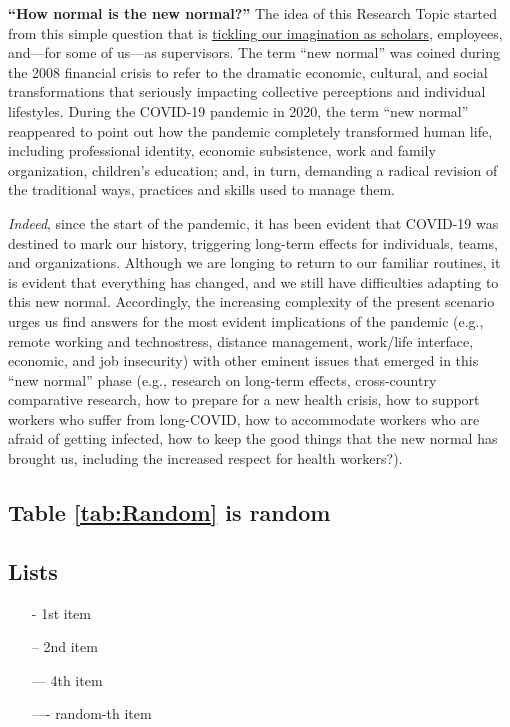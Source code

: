 \begin{flushleft}
    \textbf{“How normal is the new normal?”} The idea of this Research Topic started from this simple question that is \underline{tickling our imagination as scholars}, employees, and—for some of us—as supervisors. The term “new normal” was coined during the 2008 financial crisis to refer to the dramatic economic, cultural, and social transformations that seriously impacting collective perceptions and individual lifestyles. During the COVID-19 pandemic in 2020, the term “new normal” reappeared to point out how the pandemic completely transformed human life, including professional identity, economic subsistence, work and family organization, children's education; and, in turn, demanding a radical revision of the traditional ways, practices and skills used to manage them.\par
\textit{Indeed}, since the start of the pandemic, it has been evident that COVID-19 was destined to mark our history, triggering long-term effects for individuals, teams, and organizations. Although we are longing to return to our familiar routines, it is evident that everything has changed, and we still have difficulties adapting to this new normal. Accordingly, the increasing complexity of the present scenario urges us find answers for the most evident implications of the pandemic (e.g., remote working and technostress, distance management, work/life interface, economic, and job insecurity) with other eminent issues that emerged in this “new normal” phase (e.g., research on long-term effects, cross-country comparative research, how to prepare for a new health crisis, how to support workers who suffer from long-COVID, how to accommodate workers who are afraid of getting infected, how to keep the good things that the new normal has brought us, including the increased respect for health workers?).
\end{flushleft}

\subsection{Table \ref{tab:Random} is random}



\subsection{Lists}
\begin{itemize}
    \item[-] 1st item
    \item[--] 2nd item
    \item[---] 4th item
    \item[----] random-th item
\end{itemize}

